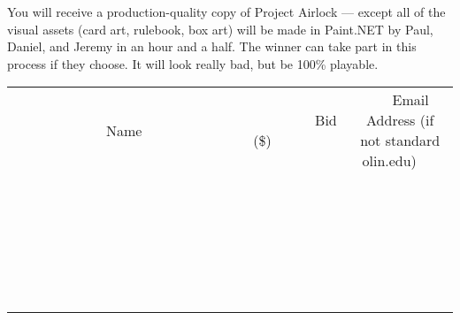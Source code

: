 \documentclass[11pt]{article}
\begin{document}
You will receive a production-quality copy of Project Airlock --- except all of the visual assets (card art, rulebook, box art) will be made in Paint.NET by Paul, Daniel, and Jeremy in an hour and a half. The winner can take part in this process if they choose. It will look really bad, but be 100\% playable. \\
					[6ex]
					\begin{tabular}{c c c}
						~~~~~~~~~~~~~Name~~~~~~~~~~~~~ & ~~~~~~~~~Bid (\$)~~~~~~~~~ & ~~~Email Address (if not standard olin.edu)~~~ \\
				
 & & \\
\hline
 & & \\
\hline
 & & \\
\hline
 & & \\
\hline
 & & \\
\hline
 & & \\
\hline
 & & \\
\hline
 & & \\
\hline
 & & \\
\hline
 & & \\
\hline
 & & \\
\hline
 & & \\
\hline
 & & \\
\hline
 & & \\
\hline
 & & \\
\hline
 & & \\
\hline
 & & \\
\hline
 & & \\
\hline
 & & \\
\hline
 & & \\
\hline
 & & \\
\hline
 & & \\
\hline
 & & \\
\hline
 & & \\
\hline
 & & \\
\hline
 & & \\
\hline
					\end{tabular}
					\clearpage
				
\end{document}
